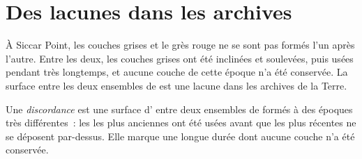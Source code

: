 \section{Des lacunes dans les archives}

À Siccar Point, les couches grises et le grès rouge ne se sont pas formés
l'un après l'autre. Entre les deux, les couches grises ont été inclinées
et soulevées, puis usées pendant très longtemps, et aucune couche de cette
époque n'a été conservée. La surface entre les deux ensembles de 
est une lacune dans les archives de la Terre.

\begin{definition}[Discordance]\label{def:g7:geological-time:unconformity}
Une \emph{discordance} est une surface d' entre
deux ensembles de  formés à des époques très différentes~: les
 les plus anciennes ont été usées avant que les plus récentes ne se
déposent par-dessus. Elle marque une longue durée dont aucune couche n'a
été conservée.
\end{definition}

